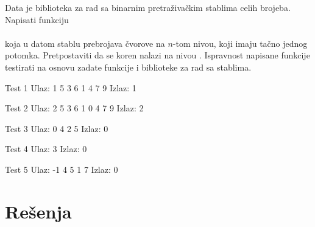 \begin{Exercise}[label=906]
  Data je biblioteka za rad sa binarnim pretraživačkim stablima
  celih brojeba. Napisati funkciju\\ 
\\
  koja u datom stablu prebrojava čvorove na $n$-tom nivou, koji
  imaju tačno jednog potomka. Pretpostaviti da se koren nalazi na
  nivou . Ispravnost napisane funkcije testirati na osnovu zadate
   funkcije i biblioteke za rad sa stablima.

\begin{minitest}
\begin{test}{Test 1}
Ulaz:   
 1 5 3 6 1 4 7 9    
Izlaz:  
 1                                                            
\end{test}
\end{minitest}
\begin{minitest}
\begin{test}{Test 2}
Ulaz:   
 2 5 3 6 1 0 4 7 9  
Izlaz:  
 2          
\end{test}
\end{minitest}
\begin{minitest}
\begin{test}{Test 3}
Ulaz:  
 0 4 2 5   
Izlaz: 
 0       
\end{test}
\end{minitest}


\begin{minitest}
\begin{test}{Test 4}
Ulaz:  
  3
Izlaz: 
 0       
\end{test}
\end{minitest}
\begin{minitest}
\begin{test}{Test 5}
Ulaz:  
  -1 4 5 1 7 
Izlaz: 
 0       
\end{test}
\end{minitest}

\end{Exercise}
\begin{Answer}[ref=906]
\end{Answer}

\section{Rešenja}
\shipoutAnswer
